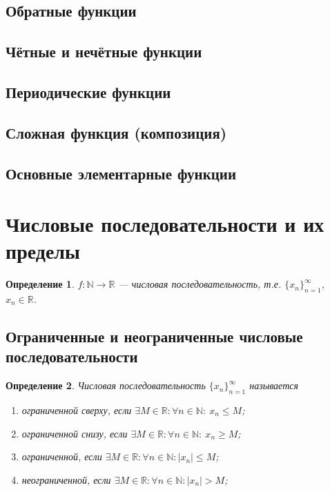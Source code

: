 \documentclass[a4paper,12pt]{article} %
\newtheorem{definition}{Определение}[subsection]
\theoremstyle{remark}
\begin{document}
\subsection{Обратные функции}
\subsection{Чётные и нечётные функции}
\subsection{Периодические функции}
\subsection{Сложная функция (композиция)}
\subsection{Основные элементарные функции}

\section{Числовые последовательности и их пределы}



\begin{definition}
	$f:\mathbb{N}\rightarrow \mathbb{R}$ --- числовая последовательность, т.е. $\{x_n\}_{n=1}^\infty$, $x_n \in \mathbb{R}$.
\end{definition}



\subsection{Ограниченные и неограниченные числовые последовательности}

\begin{definition}
	Числовая последовательность $\{x_n\}_{n=1}^\infty$ называется 

	\begin{enumerate}
		\item ограниченной сверху, если $\exists M\in \mathbb{R}: \forall n\in \mathbb{N}: \ x_n\le M$;
		\item ограниченной снизу, если \space $\exists M\in \mathbb{R}: \forall n\in \mathbb{N}: \ x_n\ge M$;
		\item ограниченной, если \space\space\space\space\space\space\space\space\space $\exists M\in \mathbb{R}: \forall n\in \mathbb{N}:|x_n| \le M$;
		\item неограниченной, если \space\space\space\space\space\space $\exists M\in \mathbb{R}: \forall n\in \mathbb{N}:|x_n|> M$;
	\end{enumerate}
\end{definition}
\end{document}
